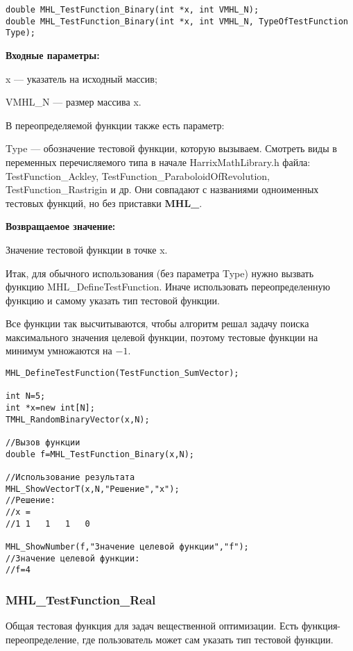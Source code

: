 \documentclass[a4paper,12pt]{article}
\begin{document}
\begin{lstlisting}[label=code_syntax_MHL_TestFunction_Binary,caption=Синтаксис]
double MHL_TestFunction_Binary(int *x, int VMHL_N);
double MHL_TestFunction_Binary(int *x, int VMHL_N, TypeOfTestFunction Type);
\end{lstlisting}

\textbf{Входные параметры:}

x --- указатель на исходный массив;

VMHL\_N --- размер массива x.

В переопределяемой функции также есть параметр:
  
Type --- обозначение тестовой функции, которую вызываем.
Смотреть виды в переменных перечисляемого типа в начале HarrixMathLibrary.h файла: TestFunction\_Ackley, TestFunction\_ParaboloidOfRevolution, TestFunction\_Rastrigin и др. Они совпадают с названиями одноименных тестовых функций, но без приставки \textbf{MHL\_}.

\textbf{Возвращаемое значение:}
 
Значение тестовой функции в точке x.

Итак, для обычного использования (без параметра Type) нужно вызвать функцию MHL\_DefineTestFunction. Иначе использовать переопределенную функцию и самому указать тип тестовой функции.

Все функции так высчитываются, чтобы алгоритм решал задачу поиска максимального значения целевой функции, поэтому тестовые функции на минимум умножаются на $-1$.


\begin{lstlisting}[label=code_use_MHL_TestFunction_Binary,caption=Пример использования]
MHL_DefineTestFunction(TestFunction_SumVector);

int N=5;
int *x=new int[N];
TMHL_RandomBinaryVector(x,N);

//Вызов функции
double f=MHL_TestFunction_Binary(x,N);

//Использование результата
MHL_ShowVectorT(x,N,"Решение","x");
//Решение:
//x =
//1	1	1	1	0

MHL_ShowNumber(f,"Значение целевой функции","f");
//Значение целевой функции:
//f=4
\end{lstlisting}

\subsubsection{MHL\_TestFunction\_Real}\label{MHL_TestFunction_Real}

Общая тестовая функция для задач вещественной оптимизации. Есть функция-переопределение, где пользователь может сам указать тип тестовой функции.
\end{document}
